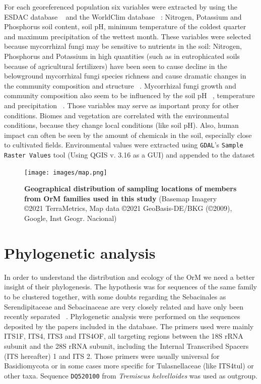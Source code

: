 For each georeferenced population six variables were extracted by using the ESDAC database ~\citep{panagos2012} and the WorldClim database ~\citep{hijmans2005}: Nitrogen, Potassium and Phosphorus soil content, soil pH, minimum temperature of the coldest quarter and maximum precipitation of the wettest month. These variables were selected because mycorrhizal fungi may be sensitive to nutrients in the soil: Nitrogen, Phosphorus and Potassium in high quantities (such as in eutrophicated soils because of agricultural fertilizers) have been seen to cause decline in the belowground mycorrhizal fungi species richness and cause dramatic changes in the community composition and structure ~\citep{lilleskov2002, baar2002, grant2011}. Mycorrhizal fungi growth and community composition also seem to be influenced by the soil pH ~\citep{aarle2002, carrino-kyker2016}, temperature and precipitation ~\citep{rillig2003}. Those variables may serve as important proxy for other conditions. Biomes and vegetation are correlated with the environmental conditions, because they change local conditions (like soil pH). Also, human impact can often be seen by the amount of chemicals in the soil, especially close to cultivated fields.
Environmental values were extracted using \texttt{GDAL}'s \texttt{Sample Raster Values} tool (Using QGIS v. 3.16 as a GUI) and appended to the dataset

\begin{figure}[htbp]
\centering
\texttt{[image: images/map.png]}
\caption{\textbf{Geographical distribution of sampling locations of members from OrM families used in this study} (Basemap Imagery ©2021 TerraMetrics, Map data ©2021 GeoBasis-DE\slash BKG (©2009), Google, Inst Geogr. Nacional)}
\end{figure}

\chapter{Phylogenetic analysis}
\label{phylogeneticanalysis}

In order to understand the distribution and ecology of the OrM we need a better insight of their phylogenesis. The hypothesis was for sequences of the same family to be clustered together, with some doubts regarding the Sebacinales as Serendipitaceae and Sebacinaceae are very closely related and have only been recently separated ~\citep{weiss2016}.
Phylogenetic analysis were performed on the sequences deposited by the papers included in the database.
The primers used were mainly ITS1F, ITS4, ITS3 and ITS4OF, all targeting regions between the 18S rRNA subunit and the 28S rRNA subunit, including the Internal Transcribed Spacers (ITS hereafter) 1 and ITS 2. Those primers were usually universal for Basidiomycota or in some cases more specific for Tulasnellaceae (like ITS4tul) or other taxa.
Sequence \texttt{DQ520100} from \emph{Tremiscus helvelloides} was used as outgroup.

